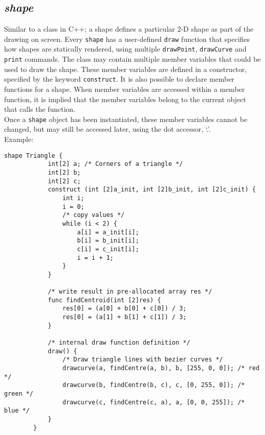     \subsection{\textit{shape}}
    Similar to a class in C++; a shape defines a particular 2-D shape as part of the drawing on screen. Every \texttt{shape} has a user-defined \texttt{draw} function that specifies how shapes are statically rendered, using multiple \texttt{drawPoint}, \texttt{drawCurve} and \texttt{print} commands. The class may contain multiple member variables that could be used to draw the shape. These member variables are defined in a constructor, specified by the keyword \texttt{construct}. It is also possible to declare member functions for a shape. When member variables are accessed within a member function, it is implied that the member variables belong to the current object that calls the function.\\
    Once a \texttt{shape} object has been instantiated, these member variables cannot be changed, but may still be accessed later, using the dot accessor, `.'.\\
    Example:\\
    \begin{lstlisting}[style=sol]
        shape Triangle {
            int[2] a; /* Corners of a triangle */
            int[2] b;
            int[2] c;
            construct (int [2]a_init, int [2]b_init, int [2]c_init) {
                int i;
                i = 0;
                /* copy values */
                while (i < 2) {
                    a[i] = a_init[i];
                    b[i] = b_init[i];
                    c[i] = c_init[i];
                    i = i + 1;
                }
            }
        
            /* write result in pre-allocated array res */
            func findCentroid(int [2]res) {
                res[0] = (a[0] + b[0] + c[0]) / 3;
                res[0] = (a[1] + b[1] + c[1]) / 3;
            }

            /* internal draw function definition */
            draw() {
                /* Draw triangle lines with bezier curves */
                drawcurve(a, findCentre(a, b), b, [255, 0, 0]); /* red */
                drawcurve(b, findCentre(b, c), c, [0, 255, 0]); /* green */
                drawcurve(c, findCentre(c, a), a, [0, 0, 255]); /* blue */
            }
        }
    \end{lstlisting}

